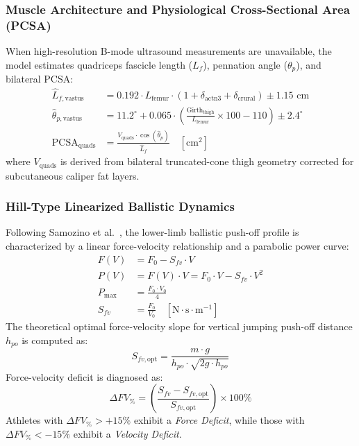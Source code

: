 \documentclass[11pt,a4paper]{article}
\begin{document}
\subsubsection{Muscle Architecture and Physiological Cross-Sectional Area (PCSA)}
When high-resolution B-mode ultrasound measurements are unavailable, the model estimates quadriceps fascicle length ($L_f$), pennation angle ($\theta_p$), and bilateral PCSA:
\begin{align}
    \hat{L}_{f, \text{vastus}} &= 0.192 \cdot L_{\text{femur}} \cdot (1 + \delta_{\text{actn3}} + \delta_{\text{crural}}) \pm 1.15\text{ cm} \\
    \hat{\theta}_{p, \text{vastus}} &= 11.2^\circ + 0.065 \cdot \left(\frac{\text{Girth}_{\text{thigh}}}{L_{\text{femur}}} \times 100 - 110\right) \pm 2.4^\circ \\
    \text{PCSA}_{\text{quads}} &= \frac{V_{\text{quads}} \cdot \cos(\hat{\theta}_p)}{\hat{L}_f} \quad [\text{cm}^2]
\end{align}
where $V_{\text{quads}}$ is derived from bilateral truncated-cone thigh geometry corrected for subcutaneous caliper fat layers.

\subsubsection{Hill-Type Linearized Ballistic Dynamics}
Following Samozino et al.\ \cite{samozino2012, samozino2014}, the lower-limb ballistic push-off profile is characterized by a linear force-velocity relationship and a parabolic power curve:
\begin{align}
    F(V) &= F_0 - S_{fv} \cdot V \\
    P(V) &= F(V) \cdot V = F_0 \cdot V - S_{fv} \cdot V^2 \\
    P_{\text{max}} &= \frac{F_0 \cdot V_0}{4} \\
    S_{fv} &= \frac{F_0}{V_0} \quad [\text{N} \cdot \text{s} \cdot \text{m}^{-1}]
\end{align}
The theoretical optimal force-velocity slope for vertical jumping push-off distance $h_{po}$ is computed as:
\begin{equation}
    S_{fv, \text{opt}} = \frac{m \cdot g}{h_{po} \cdot \sqrt{2g \cdot h_{po}}}
\end{equation}
Force-velocity deficit is diagnosed as:
\begin{equation}
    \Delta FV_{\%} = \left(\frac{S_{fv} - S_{fv, \text{opt}}}{S_{fv, \text{opt}}}\right) \times 100\%
\end{equation}
Athletes with $\Delta FV_{\%} > +15\%$ exhibit a \textit{Force Deficit}, while those with $\Delta FV_{\%} < -15\%$ exhibit a \textit{Velocity Deficit}.
\end{document}
